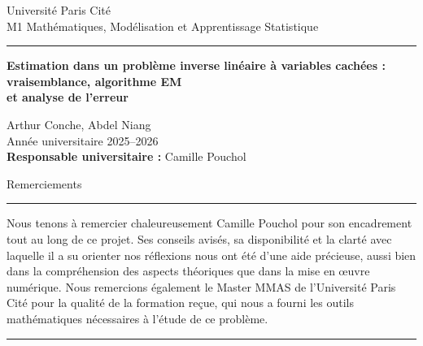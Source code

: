 \documentclass[12pt, a4paper]{article}
\theoremstyle{definition}
\begin{document}
\begin{titlepage}
    \begin{center}

        {\Large Université Paris Cité \\[0.3em]
        M1 Mathématiques, Modélisation et Apprentissage Statistique} \\[1.5em]

        \rule{\textwidth}{0.4pt}

        \vspace{4em}

        {\huge\bfseries Estimation dans un problème inverse linéaire
        à variables cachées :\\[0.6em]
        \large vraisemblance, algorithme EM\\[0.2em]
        et analyse de l'erreur \par}

        \vspace{5em}

        {\Large Arthur Conche, Abdel Niang} \\[1em]
        {\Large Année universitaire 2025--2026} \\[6em]

        \textbf{Responsable universitaire :} Camille Pouchol

    \end{center}
\end{titlepage}

\newpage
\begin{center}
    {\Large Remerciements}
\end{center}
\vspace{0.5em}
\noindent\rule{\textwidth}{1pt}

\vspace{0.5em}
Nous tenons à remercier chaleureusement Camille Pouchol pour son encadrement tout au long de ce projet. Ses conseils avisés, sa disponibilité et la clarté avec laquelle il a su orienter nos réflexions nous ont été d'une aide précieuse, aussi bien dans la compréhension des aspects théoriques que dans la mise en œuvre numérique.
Nous remercions également le Master MMAS de l'Université Paris Cité pour la qualité de la formation reçue, qui nous a fourni les outils mathématiques nécessaires à l'étude de ce problème.
\vspace{1.2em}
\noindent\rule{\textwidth}{1pt}

\newpage
\tableofcontents
\end{document}
